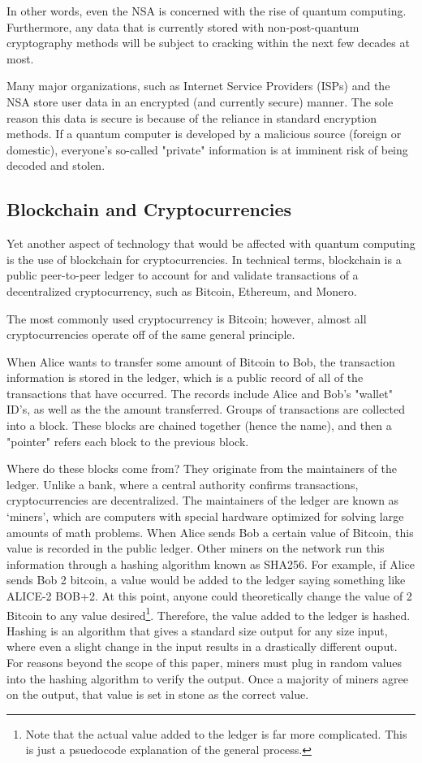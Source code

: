 \documentclass[10pt,journal,compsoc]{IEEEtran}
\begin{document}
In other words, even the NSA is concerned with the rise of quantum computing. Furthermore, any data that is currently stored with non-post-quantum cryptography methods  will be subject to cracking within the next few decades at most. 

Many major organizations, such as Internet Service Providers (ISPs) and the NSA store user data in an encrypted (and currently secure) manner. The sole reason this data is secure is because of the reliance in standard encryption methods. If a quantum computer is developed by a malicious source (foreign or domestic), everyone's so-called "private" information is at imminent risk of being decoded and stolen. 

\subsection{Blockchain and Cryptocurrencies}
Yet another aspect of technology that would be affected with quantum computing is the use of blockchain for cryptocurrencies. In technical terms, blockchain is a public peer-to-peer ledger to account for and validate transactions of a decentralized cryptocurrency, such as Bitcoin, Ethereum, and Monero. 

The most commonly used cryptocurrency is Bitcoin; however, almost all cryptocurrencies operate off of the same general principle\cite{Bitcoin}. 

When Alice wants to transfer some amount of Bitcoin to Bob, the transaction information is stored in the ledger, which is a public record of all of the transactions that have occurred. The records include Alice and Bob's "wallet" ID's, as well as the the amount transferred. Groups of transactions are collected into a block. These blocks are chained together (hence the name), and then a "pointer" refers each block to the previous block. 

Where do these blocks come from? They originate  from the maintainers of the ledger. Unlike a bank, where a central authority confirms transactions, cryptocurrencies are decentralized. The maintainers of the ledger are known as `miners', which are computers with special hardware optimized for solving large amounts of math problems\cite{Aggarwal}. When Alice sends Bob a certain value of Bitcoin, this value is recorded in the public ledger. Other miners on the network run this information through a hashing algorithm known as SHA256. For example, if Alice sends Bob 2 bitcoin, a value would be added to the ledger saying something like ALICE-2 BOB+2. At this point, anyone could theoretically change the value of 2 Bitcoin to any value desired\footnote{Note that the actual value added to the ledger is far more complicated. This is just a psuedocode explanation of the general process.}. Therefore, the value added to the ledger is hashed. Hashing is an algorithm that gives a standard size output for any size input, where even a slight change in the input results in a drastically different ouput. For reasons beyond the scope of this paper, miners must plug in random values into the hashing algorithm to verify the output. Once a majority of miners agree on the output, that value is set in stone as the correct value. 
\end{document}
